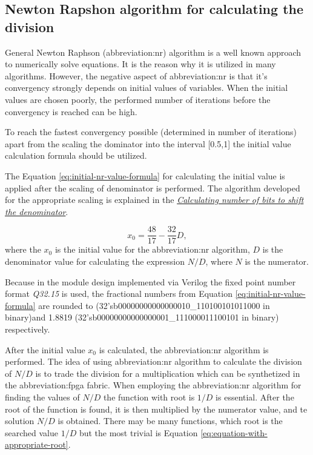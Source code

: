 \documentclass[a4paper, twoside, 11pt]{article}
\begin{document}
\subsection{Newton Rapshon algorithm for calculating the division}\label{subsection:newton-raphson-algorithm-for-calculating-the-division}
General Newton Raphson (\gls{abbreviation:nr}) algorithm is a well known approach to numerically solve equations. It is the reason why it is utilized in many algorithms. However, the negative aspect of \gls{abbreviation:nr} is that it's convergency strongly depends on initial values of variables. When the initial values are chosen poorly, the performed number of iterations before the convergency is reached can be high.\par
To reach the fastest convergency possible (determined in number of iterations) apart from the scaling the dominator into the interval [0.5,1] the initial value calculation formula should be utilized. \cite{burke-fixed-point-math-library}\par
The Equation \ref{eq:initial-nr-value-formula} for calculating the initial value  is applied after the scaling of denominator is performed. The algorithm developed for the appropriate scaling is explained in the \hyperref[subsec:calculating-number-of-bits-to-shift-the-denominator]{\textit{Calculating number of bits to shift the denominator}}.

\begin{equation}\label{eq:initial-nr-value-formula}
x_0 = \frac{48}{17} - \frac{32}{17} D,
\end{equation}
where the $x_0$ is the initial value for the \gls{abbreviation:nr} algorithm, $D$ is the denominator value for calculating the expression $N/D$, where $N$ is the numerator.\par
Because in the module design implemented via Verilog the fixed point number format \textit{Q32.15} is used, the fractional numbers from Equation \ref{eq:initial-nr-value-formula} are rounded to (32'sb00000000000000010\_110100101011000 in binary)\newline and 1.8819 (32'sb00000000000000001\_111000011100101 in binary) respectively.\par
After the initial value $x_0$ is calculated, the \gls{abbreviation:nr} algorithm is performed. The idea of using \gls{abbreviation:nr} algorithm to calculate the division of $N/D$ is to trade the division for a multiplication which can be synthetized in the \gls{abbreviation:fpga} fabric. When employing the \gls{abbreviation:nr} algorithm for finding the values of $N/D$ the function with root is $1/D$ is essential. After the root of the function is found, it is then multiplied by the numerator value, and te solution $N/D$ is obtained. There may be many functions, which root is the searched value $1/D$ but the most trivial is Equation \ref{eq:equation-with-appropriate-root}.\par
\end{document}
